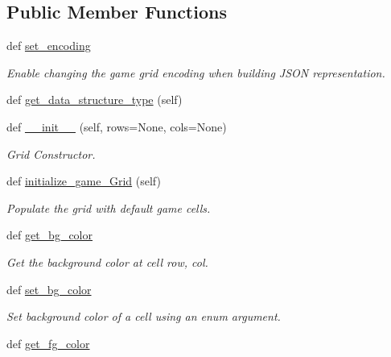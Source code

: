 \subsection*{Public Member Functions}
\begin{DoxyCompactItemize}
\item 
def \mbox{\hyperlink{classbridges_1_1game__grid_1_1_game_grid_a6bf2b62c9a3cf8d3f852de3d086658bc}{set\+\_\+encoding}}
\begin{DoxyCompactList}\small\item\em Enable changing the game grid encoding when building J\+S\+ON representation. \end{DoxyCompactList}\item 
def \mbox{\hyperlink{classbridges_1_1game__grid_1_1_game_grid_a0a38f422a54e93cfd2816e0051fb8d5a}{get\+\_\+data\+\_\+structure\+\_\+type}} (self)
\item 
def \mbox{\hyperlink{classbridges_1_1game__grid_1_1_game_grid_a9f01ebe1e63708af7e8f1baab430a3cc}{\+\_\+\+\_\+init\+\_\+\+\_\+}} (self, rows=None, cols=None)
\begin{DoxyCompactList}\small\item\em Grid Constructor. \end{DoxyCompactList}\item 
def \mbox{\hyperlink{classbridges_1_1game__grid_1_1_game_grid_aefa77d94a0f5d43d029e5bb9856dd911}{initialize\+\_\+game\+\_\+\+Grid}} (self)
\begin{DoxyCompactList}\small\item\em Populate the grid with default game cells. \end{DoxyCompactList}\item 
def \mbox{\hyperlink{classbridges_1_1game__grid_1_1_game_grid_af99b99cdd5c487942ec15f5a5e5b208b}{get\+\_\+bg\+\_\+color}}
\begin{DoxyCompactList}\small\item\em Get the background color at cell row, col. \end{DoxyCompactList}\item 
def \mbox{\hyperlink{classbridges_1_1game__grid_1_1_game_grid_ab73bc9c4e6553629cad3b3244be50db9}{set\+\_\+bg\+\_\+color}}
\begin{DoxyCompactList}\small\item\em Set background color of a cell using an enum argument. \end{DoxyCompactList}\item 
def \mbox{\hyperlink{classbridges_1_1game__grid_1_1_game_grid_aefb99616dfc0f51601cebf6a420a965f}{get\+\_\+fg\+\_\+color}}

\end{DoxyCompactItemize}
